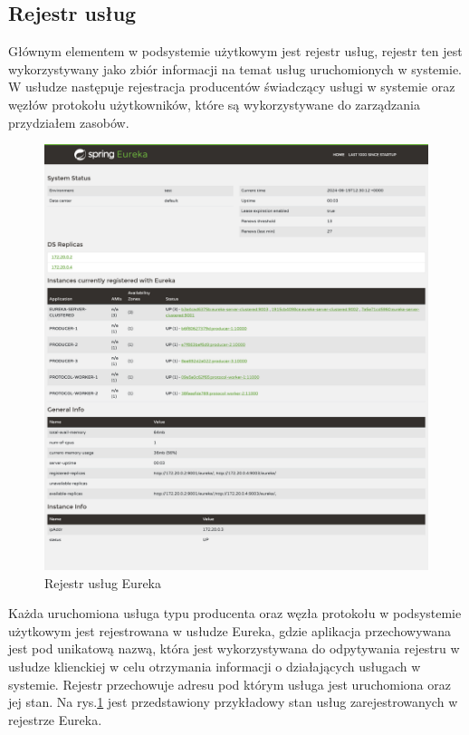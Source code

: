 \subsection{Rejestr usług}

Głównym elementem w podsystemie użytkowym jest rejestr usług, rejestr ten jest wykorzystywany jako zbiór informacji na temat usług uruchomionych w systemie. W usłudze następuje rejestracja producentów świadczący usługi w systemie oraz węzłów protokołu użytkowników, które są wykorzystywane do zarządzania przydziałem zasobów.

\begin{figure}[!htbp]
    \centering
    \includegraphics[width=\textwidth]{images/implementation/ServerDiscovery3Producer2Workers.png}
    \caption{Rejestr usług Eureka}
    \label{eurekaServerItems}
\end{figure}

Każda uruchomiona usługa typu producenta oraz węzła protokołu w podsystemie użytkowym jest rejestrowana w usłudze Eureka, gdzie aplikacja przechowywana jest pod unikatową nazwą, która jest wykorzystywana do odpytywania rejestru w usłudze klienckiej w celu otrzymania informacji o działających usługach w systemie. Rejestr przechowuje adresu pod którym usługa jest uruchomiona oraz jej stan. Na rys.\ref{eurekaServerItems} jest przedstawiony przykładowy stan usług zarejestrowanych w rejestrze Eureka.



